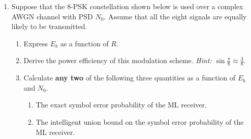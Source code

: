 \documentclass[10pt]{report}
\begin{document}
\begin{enumerate}
  \item Suppose that the 8-PSK constellation shown below is used over a complex AWGN channel with PSD $N_0$.
    Assume that all the eight signals are equally likely to be transmitted.
  \begin{figure}[h]
    \centering
  \end{figure}
    \begin{enumerate}
      \item Express $E_b$ as a function of $R$.
      \item Derive the power efficiency of this modulation scheme. \textit{Hint:} $\sin \frac{\pi}{8} \approx \frac{3}{8}$.
      \item Calculate \textbf{any two} of the following three quantities as a function of $E_b$ and $N_0$.
        \begin{enumerate}
          \item The exact symbol error probability of the ML receiver.
          \item The intelligent union bound on the symbol error probability of the ML receiver.

\end{enumerate}
\end{enumerate}
\end{enumerate}
\end{document}
